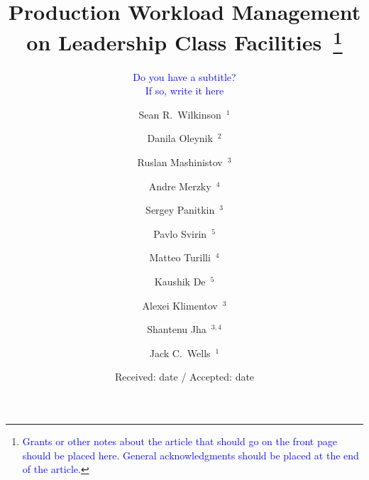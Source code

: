 \documentclass[smallextended]{svjour3}      %
\begin{document}
\title{Production Workload Management on Leadership Class
Facilities~\thanks{\textcolor{blue}{%
Grants or other notes about the article that should go on the front page should
be placed here. General acknowledgments should be placed at the end of the
article.}}
}
\subtitle{\textcolor{blue}{Do you have a subtitle?\\ If so, write it here}}


\author{%
    Sean R.\ Wilkinson~$^1$ \and
    Danila Oleynik~$^2$ \and
    Ruslan Mashinistov~$^3$ \and
    Andre Merzky~$^4$ \and
    Sergey Panitkin~$^3$ \and
    Pavlo Svirin~$^5$ \and
    Matteo Turilli~$^4$ \and
    Kaushik De~$^5$ \and
    Alexei Klimentov~$^3$ \and
    Shantenu Jha~$^{3, 4}$ \and
    Jack C.\ Wells~$^1$
}



\date{Received: date / Accepted: date}

\maketitle

\end{document}
